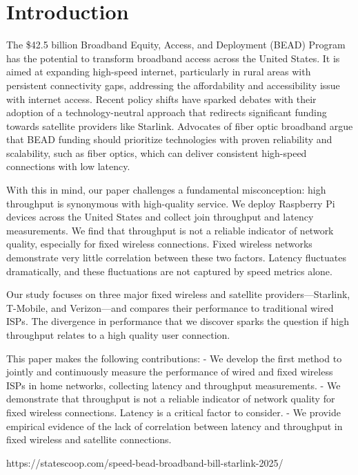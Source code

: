 \section{Introduction} \label{sec:introduction}
The \$42.5 billion Broadband Equity, Access, and Deployment (BEAD) Program has the potential 
to transform broadband access across the United States. It is aimed at expanding high-speed internet, 
particularly in rural areas with persistent connectivity gaps, addressing the affordability and 
accessibility issue with internet access. 
Recent policy shifts have sparked debates with their adoption of a technology-neutral approach
that redirects significant funding towards satellite providers like Starlink.
Advocates of fiber optic broadband argue that BEAD funding should prioritize 
technologies with proven reliability and scalability, such as fiber optics, 
which can deliver consistent high-speed connections with low latency.

With this in mind, our paper challenges a fundamental misconception: high throughput 
is synonymous with high-quality service. We deploy Raspberry Pi devices across the United States and collect
join throughput and latency measurements. We find that throughput is not a reliable indicator 
of network quality, especially for fixed wireless connections. Fixed wireless networks demonstrate 
very little correlation between these two factors. Latency fluctuates dramatically, and these fluctuations 
are not captured by speed metrics alone.

Our study focuses on three major fixed wireless and satellite providers—Starlink, T-Mobile, and Verizon—and 
compares their performance to traditional wired ISPs. The divergence in performance that we discover sparks the 
question if high throughput relates to a high quality user connection. 

This paper makes the following contributions:
- We develop the first method to jointly and continuously measure the performance of wired and fixed wireless
ISPs in home networks, collecting latency and throughput measurements. 
- We demonstrate that throughput is not a reliable indicator of network quality for fixed wireless connections.
Latency is a critical factor to consider.
- We provide empirical evidence of the lack of correlation between latency and throughput in fixed wireless and satellite connections.

https://statescoop.com/speed-bead-broadband-bill-starlink-2025/
